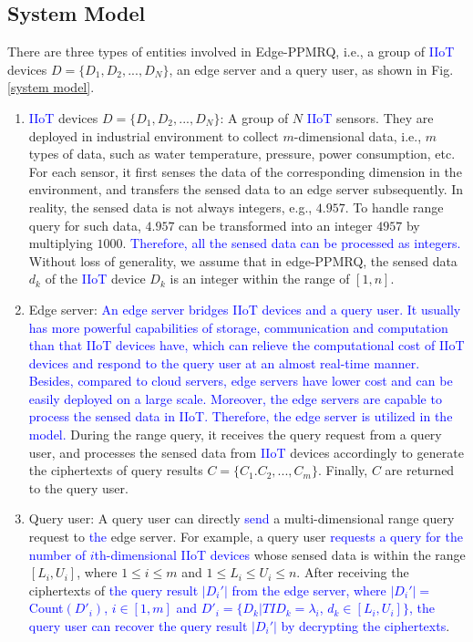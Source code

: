 \documentclass[IEEE JOURNAL OF BIOMEDICAL AND HEALTH INFORMATICS]{IEEEtran}
\begin{document}
{\subsection{System Model}
There are three types of entities involved in Edge-PPMRQ, i.e., a group of \textcolor{blue}{IIoT} devices $D=\{D_1, D_2, ... , D_N\}$, an edge server and a query user, as shown in Fig. \ref{system model}.
\begin{enumerate}
  \item \textcolor{blue}{IIoT} devices $D=\{D_1, D_2, ... ,D_N\}$: A group of $N$ \textcolor{blue}{IIoT} sensors. They are deployed in industrial environment to collect $m$-dimensional data, i.e., $m$ types of data, such as water temperature, pressure, power consumption, etc. For each sensor, it first senses the data of the corresponding dimension in the environment, and transfers the sensed data to an edge server subsequently. In reality, the sensed data is not always integers, e.g., $4.957$. To handle range query for such data, $4.957$ can be transformed into an integer $4957$ by multiplying $1000$. \textcolor{blue}{Therefore, all the sensed data can be processed as integers.} Without loss of generality, we assume that in edge-PPMRQ, the sensed data $d_k$ of the \textcolor{blue}{IIoT} device $D_k$ is an integer within the range of $[1, n]$. 
  
  \item Edge server: \textcolor{blue}{An edge server bridges \textcolor{blue}{IIoT} devices and a query user. It usually has more powerful capabilities of storage, communication and computation than that IIoT devices have, which can relieve the computational cost of IIoT devices and respond to the query user at an almost real-time manner. Besides, compared to cloud servers, edge servers have lower cost and can be easily deployed on a large scale. Moreover, the edge servers are capable to process the sensed data in IIoT. Therefore, the edge server is utilized in the model.} During the range query, it receives the query request from a query user, and processes the sensed data from \textcolor{blue}{IIoT} devices accordingly to generate the ciphertexts of query results $C=\{C_1.C_2, ..., C_m\}$. Finally, $C$ are returned to the query user.
  	
  \item Query user: A query user can directly \textcolor{blue}{send} a multi-dimensional range query request to \textcolor{blue}{the} edge server. For example, a query user \textcolor{blue}{requests a query for the number of  $i$th-dimensional IIoT devices} whose sensed data is within the range $[L_i, U_i]$, where $1 \le i \le m$ and $ 1 \le L_i \le U_i \le n $. After receiving the ciphertexts of \textcolor{blue}{the query result $|D_i'|$ from the edge server, where $|D_i'|=$ Count$(D'_i)$, $i\in [1, m]$ and $D'_i=\{D_k | TID_k=\lambda_i$, $d_k \in [L_i, U_i]\}$,  the query user can recover the query result $|D_i'|$ by decrypting the ciphertexts}.
\end{enumerate}

}
\end{document}
